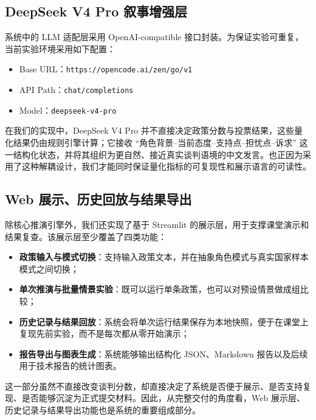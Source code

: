 \documentclass[12pt,a4paper]{ctexart}
\begin{document}
\subsection{DeepSeek V4 Pro 叙事增强层}
系统中的 LLM 适配层采用 OpenAI-compatible 接口封装。为保证实验可重复，当前实验环境采用如下配置：
\begin{itemize}
  \item Base URL：\texttt{https://opencode.ai/zen/go/v1}
  \item API Path：\texttt{chat/completions}
  \item Model：\texttt{deepseek-v4-pro}
\end{itemize}

在我们的实现中，DeepSeek V4 Pro 并不直接决定政策分数与投票结果，这些量化结果仍由规则引擎计算；它接收 ``角色背景--当前态度--支持点--担忧点--诉求'' 这一结构化状态，并将其组织为更自然、接近真实谈判语境的中文发言。也正因为采用了这种解耦设计，我们才能同时保证量化指标的可复现性和展示语言的可读性。

\subsection{Web 展示、历史回放与结果导出}
除核心推演引擎外，我们还实现了基于 Streamlit 的展示层，用于支撑课堂演示和结果复查。该展示层至少覆盖了四类功能：
\begin{itemize}
  \item \textbf{政策输入与模式切换}：支持输入政策文本，并在抽象角色模式与真实国家样本模式之间切换；
  \item \textbf{单次推演与批量情景实验}：既可以运行单条政策，也可以对预设情景做成组比较；
  \item \textbf{历史记录与结果回放}：系统会将单次运行结果保存为本地快照，便于在课堂上复现先前实验，而不是每次都从零开始演示；
  \item \textbf{报告导出与图表生成}：系统能够输出结构化 JSON、Markdown 报告以及后续用于技术报告的统计图表。
\end{itemize}
这一部分虽然不直接改变谈判分数，却直接决定了系统是否便于展示、是否支持复现、是否能够沉淀为正式提交材料。因此，从完整交付的角度看，Web 展示层、历史记录与结果导出功能也是系统的重要组成部分。
\end{document}
